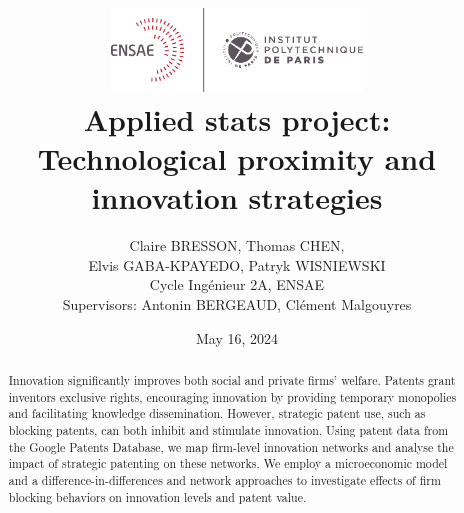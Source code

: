 \documentclass[12pt]{article}
\title{{\includegraphics[width=0.5\textwidth]{figures/ensae.png}\\
Applied stats project:\\ Technological proximity and innovation strategies\\}}
\author{Claire BRESSON, Thomas CHEN,\\ Elvis GABA-KPAYEDO, Patryk WISNIEWSKI\\[0.25cm]
Cycle Ingénieur 2A, ENSAE \\[0.25cm]
Supervisors: Antonin BERGEAUD, Clément Malgouyres}
\date{May 16, 2024}
\begin{document}
\begin{titlingpage}
\maketitle
\begin{abstract}
Innovation significantly improves both social and private firms' welfare. Patents grant inventors exclusive rights, encouraging innovation by providing temporary monopolies and facilitating knowledge dissemination. However, strategic patent use, such as blocking patents, can both inhibit and stimulate innovation. Using patent data from the Google Patents Database, we map firm-level innovation networks and analyse the impact of strategic patenting on these networks. We employ a microeconomic model and a difference-in-differences and network approaches to investigate effects of firm blocking behaviors on innovation levels and patent value.
\end{abstract}
\end{titlingpage}
\tableofcontents
\clearpage
\end{document}
